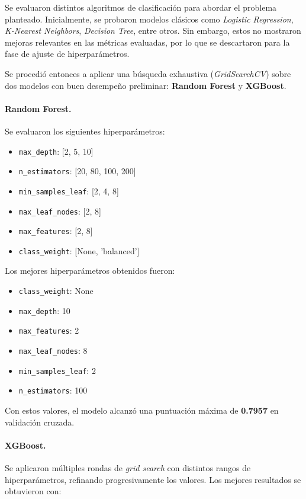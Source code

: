 \documentclass[12pt]{article}
\begin{document}
{Se evaluaron distintos algoritmos de clasificación para abordar el problema planteado. Inicialmente, se probaron modelos clásicos como \textit{Logistic Regression}, \textit{K-Nearest Neighbors}, \textit{Decision Tree}, entre otros. Sin embargo, estos no mostraron mejoras relevantes en las métricas evaluadas, por lo que se descartaron para la fase de ajuste de hiperparámetros.

Se procedió entonces a aplicar una búsqueda exhaustiva (\textit{GridSearchCV}) sobre dos modelos con buen desempeño preliminar: \textbf{Random Forest} y \textbf{XGBoost}.

\paragraph{Random Forest.}
Se evaluaron los siguientes hiperparámetros:

\begin{itemize}
    \item \texttt{max\_depth}: [2, 5, 10]
    \item \texttt{n\_estimators}: [20, 80, 100, 200]
    \item \texttt{min\_samples\_leaf}: [2, 4, 8]
    \item \texttt{max\_leaf\_nodes}: [2, 8]
    \item \texttt{max\_features}: [2, 8]
    \item \texttt{class\_weight}: [None, 'balanced']
\end{itemize}

Los mejores hiperparámetros obtenidos fueron:

\begin{itemize}
    \item \texttt{class\_weight}: None
    \item \texttt{max\_depth}: 10
    \item \texttt{max\_features}: 2
    \item \texttt{max\_leaf\_nodes}: 8
    \item \texttt{min\_samples\_leaf}: 2
    \item \texttt{n\_estimators}: 100
\end{itemize}

Con estos valores, el modelo alcanzó una puntuación máxima de \textbf{0.7957} en validación cruzada.


\paragraph{XGBoost.}
Se aplicaron múltiples rondas de \textit{grid search} con distintos rangos de hiperparámetros, refinando progresivamente los valores. Los mejores resultados se obtuvieron con:

}
\end{document}
